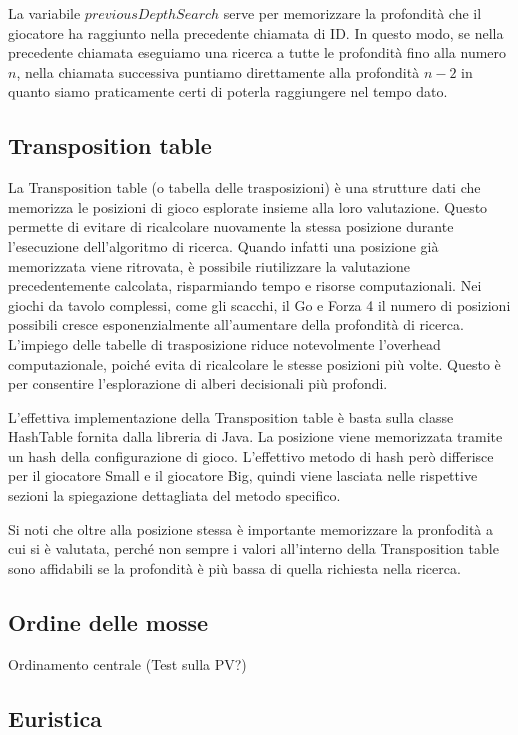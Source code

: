 \documentclass[a4paper]{article}
\begin{document}
La variabile $previousDepthSearch$ serve per memorizzare la profondità che il
giocatore ha raggiunto nella precedente chiamata di ID. In questo modo, se nella
precedente chiamata eseguiamo una ricerca a tutte le profondità fino alla numero 
$n$, nella chiamata successiva puntiamo direttamente alla profondità $n - 2$ in 
quanto siamo praticamente certi di poterla raggiungere nel tempo dato.


\subsection{Transposition table}
\label{sec_transpositionTable}
La Transposition table (o tabella delle trasposizioni) è una strutture dati 
che memorizza le posizioni di gioco esplorate insieme alla loro valutazione. 
Questo permette di evitare di ricalcolare nuovamente la stessa posizione durante 
l'esecuzione dell'algoritmo di ricerca. Quando infatti una posizione già 
memorizzata viene ritrovata, è possibile riutilizzare la valutazione 
precedentemente calcolata, risparmiando tempo e risorse computazionali.
Nei giochi da tavolo complessi, come gli scacchi, il Go e Forza 4 il numero di 
posizioni possibili cresce esponenzialmente all'aumentare della profondità di 
ricerca. L'impiego delle tabelle di trasposizione riduce notevolmente l'overhead 
computazionale, poiché evita di ricalcolare le stesse posizioni più volte. 
Questo è per consentire l'esplorazione di alberi decisionali più profondi.

L'effettiva implementazione della Transposition table è basta sulla classe
HashTable fornita dalla libreria di Java. La posizione viene memorizzata tramite
un hash della configurazione di gioco. L'effettivo metodo di hash però 
differisce per il giocatore Small e il giocatore Big, quindi viene lasciata 
nelle rispettive sezioni la spiegazione dettagliata del metodo specifico.

Si noti che oltre alla posizione stessa è importante memorizzare la pronfodità
a cui si è valutata, perché non sempre i valori all'interno della Transposition
table sono affidabili se la profondità è più bassa di quella richiesta nella
ricerca.

\subsection{Ordine delle mosse}
Ordinamento centrale
(Test sulla PV?)

\subsection{Euristica}
\end{document}
